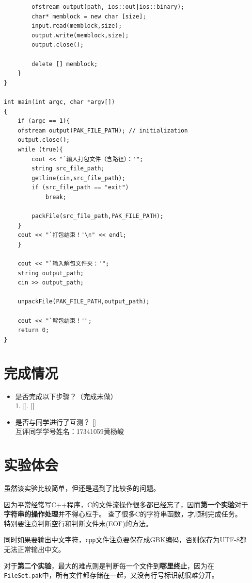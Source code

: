 \documentclass[logo,reportComp]{thesis}
\begin{document}
\begin{lstlisting}
		ofstream output(path, ios::out|ios::binary);
		char* memblock = new char [size];
		input.read(memblock,size);
		output.write(memblock,size);
		output.close();

		delete [] memblock;
	}
}

int main(int argc, char *argv[])
{
	if (argc == 1){
	ofstream output(PAK_FILE_PATH); // initialization
	output.close();
	while (true){
		cout << "`输入打包文件（含路径）：'";
		string src_file_path;
		getline(cin,src_file_path);
		if (src_file_path == "exit")
			break;

		packFile(src_file_path,PAK_FILE_PATH);
	}
	cout << "`打包结束！'\n" << endl;
	}

	cout << "`输入解包文件夹：'";
	string output_path;
	cin >> output_path;
	
	unpackFile(PAK_FILE_PATH,output_path);

	cout << "`解包结束！'";
	return 0;
}
\end{lstlisting}

\section{完成情况}
\begin{itemize}
	\item 是否完成以下步骤？（\cmark 完成\quad\xmark 未做）\\
	1. [\cmark]. [\cmark]
	\item 是否与同学进行了互测？ [\cmark] \\
	互评同学学号姓名：17341059黄杨峻
\end{itemize}

\section{实验体会}
虽然该实验比较简单，但还是遇到了比较多的问题。

因为平常经常写C++程序，C的文件流操作很多都已经忘了，因而\textbf{第一个实验}对于\textbf{字符串的操作处理}并不得心应手。
查了很多C的字符串函数，才顺利完成任务。
特别要注意判断空行和判断文件末(EOF)的方法。

同时如果要输出中文字符，\verb'cpp'文件注意要保存成GBK编码，否则保存为UTF-8都无法正常输出中文。

对于\textbf{第二个实验}，最大的难点则是判断每一个文件到\textbf{哪里终止}，因为在\verb'FileSet.pak'中，所有文件都存储在一起，又没有行号标识就很难分开。
\end{document}
